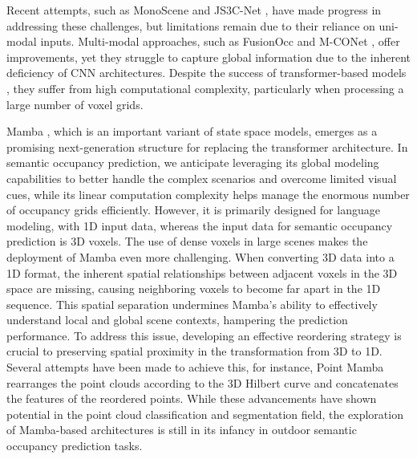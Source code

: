 \documentclass[10pt,twocolumn,letterpaper]{article}
\begin{document}
Recent attempts, such as MonoScene \cite{maximberman2020} and JS3C-Net \cite{shuransong2021}, have made progress in addressing these challenges, but limitations remain due to their reliance on uni-modal inputs. Multi-modal approaches, such as FusionOcc \cite{shuozhang2024} and M-CONet \cite{luisroldao}, offer improvements, yet they struggle to capture global information due to the inherent deficiency of CNN architectures. Despite the success of transformer-based models \cite{kaiminghe,yanchengpan2020,yunpengzhang2023}, they suffer from high computational complexity, particularly when processing a large number of voxel grids.

Mamba \cite{xiaokangchen2023}, which is an important variant of state space models, emerges as a promising next-generation structure for replacing the transformer architecture. In semantic occupancy prediction, we anticipate leveraging its global modeling capabilities to better handle the complex scenarios and overcome limited visual cues, while its linear computation complexity helps manage the enormous number of occupancy grids efficiently. However, it is primarily designed for language modeling, with 1D input data, whereas the input data for semantic occupancy prediction is 3D voxels. The use of dense voxels in large scenes makes the deployment of Mamba even more challenging. When converting 3D data into a 1D format, the inherent spatial relationships between adjacent voxels in the 3D space are missing, causing neighboring voxels to become far apart in the 1D sequence. This spatial separation undermines Mamba's ability to effectively understand local and global scene contexts, hampering the prediction performance. To address this issue, developing an effective reordering strategy is crucial to preserving spatial proximity in the transformation from 3D to 1D. Several attempts have been made to achieve this, for instance, Point Mamba \cite{jiumingliu2016} rearranges the point clouds according to the 3D Hilbert curve \cite{yimingli2022} and concatenates the features of the reordered points. While these advancements have shown potential in the point cloud classification and segmentation field, the exploration of Mamba-based architectures is still in its infancy in outdoor semantic occupancy prediction tasks.
\end{document}
